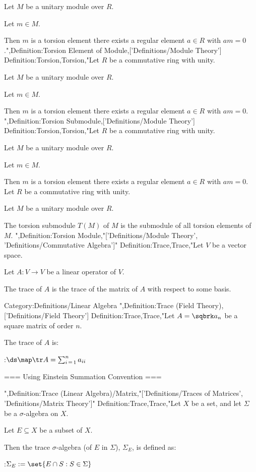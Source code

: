 Let $M$ be a unitary module over $R$.

Let $m \in M$.


Then $m$ is a torsion element  there exists a regular element $a \in R$ with $a m = 0$.",Definition:Torsion Element of Module,['Definitions/Module Theory']
Definition:Torsion,Torsion,"Let $R$ be a commutative ring with unity.

Let $M$ be a unitary module over $R$.

Let $m \in M$.


Then $m$ is a torsion element  there exists a regular element $a \in R$ with $a m = 0$.
",Definition:Torsion Submodule,['Definitions/Module Theory']
Definition:Torsion,Torsion,"Let $R$ be a commutative ring with unity.

Let $M$ be a unitary module over $R$.

Let $m \in M$.


Then $m$ is a torsion element  there exists a regular element $a \in R$ with $a m = 0$.
Let $R$ be a commutative ring with unity.

Let $M$ be a unitary module over $R$.


The torsion submodule $T(M)$ of $M$ is the submodule of all torsion elements of $M$.
",Definition:Torsion Module,"['Definitions/Module Theory', 'Definitions/Commutative Algebra']"
Definition:Trace,Trace,"Let $V$ be a vector space.

Let $A: V \to V$ be a linear operator of $V$.


The trace of $A$ is the trace of the matrix of $A$ with respect to some basis.


Category:Definitions/Linear Algebra
",Definition:Trace (Field Theory),['Definitions/Field Theory']
Definition:Trace,Trace,"Let $A = \sqbrk a_n$ be a square matrix of order $n$.


The trace of $A$ is:

:$\ds \map \tr A = \sum_{i \mathop = 1}^n a_{ii}$


=== Using Einstein Summation Convention ===

",Definition:Trace (Linear Algebra)/Matrix,"['Definitions/Traces of Matrices', 'Definitions/Matrix Theory']"
Definition:Trace,Trace,"Let $X$ be a set, and let $\Sigma$ be a $\sigma$-algebra on $X$.

Let $E \subseteq X$ be a subset of $X$.


Then the trace $\sigma$-algebra (of $E$ in $\Sigma$), $\Sigma_E$, is defined as:

:$\Sigma_E := \set {E \cap S: S \in \Sigma}$


